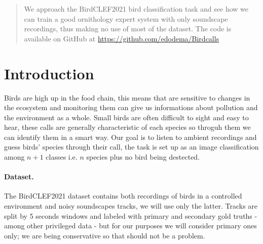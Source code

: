 \documentclass{article}
\begin{document}

\printAffiliationsAndNotice{}

\begin{abstract}
We approach the BirdCLEF2021 bird classification task and see how we can train a good ornithology expert system with only soundscape recordings, thus making no use of most of the dataset.
The code is available on GitHub at \href{https://github.com/edodema/Birdcalls}{https://github.com/edodema/Birdcalls}
\end{abstract}

\section{Introduction}
Birds are high up in the food chain, this means that are sensitive to changes in the ecosystem and monitoring them can give us informations about pollution and the environment as a whole.
Small birds are often difficult to sight and easy to hear, these calls are generally characteristic of each species so throguh them we can identify them in a smart way.
Our goal is to listen to ambient recordings and guess birds' species through their call, the task is set up as an image classification among $n+1$ classes i.e. $n$ species plus no bird being destected. 

\paragraph*{Dataset.}
The BirdCLEF2021 dataset contains both recordings of birds in a controlled environment and noisy soundscapes tracks, we will use only the latter.
Tracks are split by 5 seconds  windows and labeled with primary and secondary gold truths - among other privileged data - but for our purposes we will consider primary ones only; we are being conservative so that should not be a problem.
\end{document}
